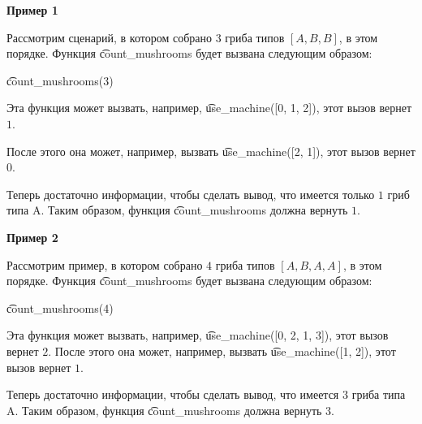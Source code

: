 \textbf{Пример 1}

Рассмотрим сценарий, в котором собрано $3$ гриба типов $[A, B, B]$, в этом порядке.
Функция \t{count\_mushrooms} будет вызвана следующим образом:

\t{count\_mushrooms(3)}

Эта функция может вызвать, например, \t{use\_machine([0, 1, 2])}, этот вызов вернет $1$.

После этого она может, например, вызвать \t{use\_machine([2, 1])}, этот вызов вернет $0$.

Теперь достаточно информации, чтобы сделать вывод, что имеется только $1$ гриб типа A.
Таким образом, функция \t{count\_mushrooms} должна вернуть $1$.

\textbf{Пример 2}

Рассмотрим пример, в котором собрано $4$ гриба типов $[A, B, A, A]$, в этом порядке.
Функция \t{count\_mushrooms} будет вызвана следующим образом:

\t{count\_mushrooms(4)}

Эта функция может вызвать, например, \t{use\_machine([0, 2, 1, 3])},
 этот вызов вернет $2$.
После этого она может, например, вызвать \t{use\_machine([1, 2])},
 этот вызов вернет $1$.

Теперь достаточно информации, чтобы сделать вывод, что имеется $3$ гриба типа A.
Таким образом, функция \t{count\_mushrooms} должна вернуть $3$.